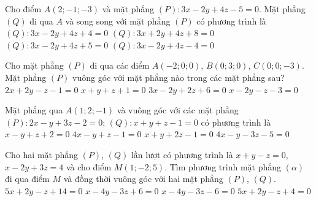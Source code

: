\begin{ex}%
	Cho điểm $A(2;-1;-3)$ và mặt phẳng $(P)\colon 3x-2y+4z-5=0$. Mặt phẳng $(Q)$ đi qua $A$ và song song với mặt phẳng $(P)$ có phương trình là
	\choice
	{\True $(Q)\colon 3x-2y+4z+4=0$}
	{$(Q)\colon 3x+2y+4z+8=0$}
	{$(Q)\colon 3x-2y+4z+5=0$}
	{$(Q)\colon 3x-2y+4z-4=0$}
\end{ex}
\begin{ex}
	Cho mặt phẳng $(P)$ đi qua các điểm $A(-2; 0; 0)$, $B(0; 3; 0)$, $C(0; 0; -3)$. Mặt phẳng $(P)$ vuông góc với mặt phẳng nào trong các mặt phẳng sau?
	\choice
	{\True $2x+2y-z-1=0$}
	{$x+y+z+1=0$}
	{$3x-2y+2z+6=0$}
	{$x-2y-z-3=0$}
\end{ex}
\begin{ex}
	Mặt phẳng qua $A(1;2;-1)$ và vuông góc với các mặt phẳng $(P) \colon 2x-y+3z-2=0$; $(Q) \colon x+y+z-1=0$ có phương trình là
	\choice
	{$x-y+z+2=0$}
	{$4x-y+z-1=0$}
	{$x+y+2z-1=0$}
	{\True $4x-y-3z-5=0$}
\end{ex}
\begin{ex}
	Cho hai mặt phẳng $(P)$, $(Q)$ lần lượt có phương trình là $x+y-z=0$, $x-2y+3z=4$ và cho điểm $M(1;-2;5)$. Tìm phương trình mặt phẳng $(\alpha)$ đi qua điểm $M$ và đồng thời vuông góc với hai mặt phẳng $(P)$, $(Q)$.
	\choice
	{$5x+2y-z+14=0$}
	{\True $x-4y-3z+6=0$}
	{$x-4y-3z-6=0$}
	{$5x+2y-z+4=0$}
\end{ex}
